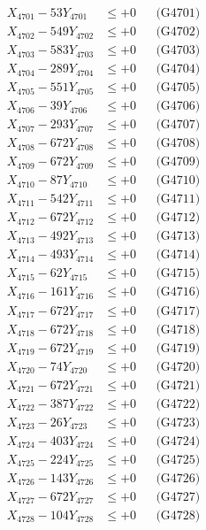 \documentclass[a4paper,10pt]{article}
\begin{document}
{\begin{align}
\allowbreak
X_{4701} - 53Y_{4701} &\leq +0 && \text{(G4701)} \\
X_{4702} - 549Y_{4702} &\leq +0 && \text{(G4702)} \\
X_{4703} - 583Y_{4703} &\leq +0 && \text{(G4703)} \\
X_{4704} - 289Y_{4704} &\leq +0 && \text{(G4704)} \\
X_{4705} - 551Y_{4705} &\leq +0 && \text{(G4705)} \\
X_{4706} - 39Y_{4706} &\leq +0 && \text{(G4706)} \\
X_{4707} - 293Y_{4707} &\leq +0 && \text{(G4707)} \\
X_{4708} - 672Y_{4708} &\leq +0 && \text{(G4708)} \\
X_{4709} - 672Y_{4709} &\leq +0 && \text{(G4709)} \\
X_{4710} - 87Y_{4710} &\leq +0 && \text{(G4710)} \\
\allowbreak
X_{4711} - 542Y_{4711} &\leq +0 && \text{(G4711)} \\
X_{4712} - 672Y_{4712} &\leq +0 && \text{(G4712)} \\
X_{4713} - 492Y_{4713} &\leq +0 && \text{(G4713)} \\
X_{4714} - 493Y_{4714} &\leq +0 && \text{(G4714)} \\
X_{4715} - 62Y_{4715} &\leq +0 && \text{(G4715)} \\
X_{4716} - 161Y_{4716} &\leq +0 && \text{(G4716)} \\
X_{4717} - 672Y_{4717} &\leq +0 && \text{(G4717)} \\
X_{4718} - 672Y_{4718} &\leq +0 && \text{(G4718)} \\
X_{4719} - 672Y_{4719} &\leq +0 && \text{(G4719)} \\
X_{4720} - 74Y_{4720} &\leq +0 && \text{(G4720)} \\
\allowbreak
X_{4721} - 672Y_{4721} &\leq +0 && \text{(G4721)} \\
X_{4722} - 387Y_{4722} &\leq +0 && \text{(G4722)} \\
X_{4723} - 26Y_{4723} &\leq +0 && \text{(G4723)} \\
X_{4724} - 403Y_{4724} &\leq +0 && \text{(G4724)} \\
X_{4725} - 224Y_{4725} &\leq +0 && \text{(G4725)} \\
X_{4726} - 143Y_{4726} &\leq +0 && \text{(G4726)} \\
X_{4727} - 672Y_{4727} &\leq +0 && \text{(G4727)} \\
X_{4728} - 104Y_{4728} &\leq +0 && \text{(G4728)} \\

\end{align}}
\end{document}
